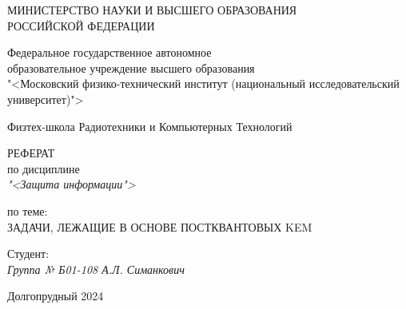 \thispagestyle{empty}

\begin{center}
    МИНИСТЕРСТВО НАУКИ И ВЫСШЕГО ОБРАЗОВАНИЯ \\ РОССИЙСКОЙ ФЕДЕРАЦИИ

    \vspace{20pt}
    
    Федеральное государственное автономное \\ образовательное учреждение высшего образования \\
    "<Московский физико-технический институт (национальный исследовательский университет)"> \\

    \vspace{20pt}

	Физтех-школа Радиотехники и Компьютерных Технологий
\end{center}

\vfill

\begin{center}
    РЕФЕРАТ \\  
    по дисциплине \\
    \textit{"<Защита информации">}

    \vspace{20pt}

    по теме: \\
    \uppercase{Задачи, лежащие в основе постквантовых KEM}
\end{center}

\vfill

    \noindent Студент: \\
    \textit{Группа № Б01-108 \hfill А.Л. Симанкович}

\vspace{20pt}

\begin{center}
    Долгопрудный 2024
\end{center}